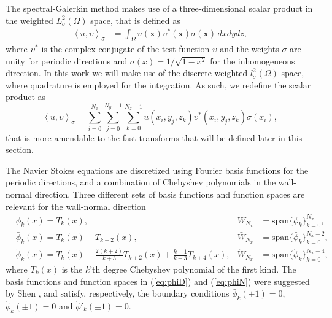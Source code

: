 \documentclass[preprint]{elsarticle}
\newcommand{\N}[1]{\check{#1}}
\newcommand{\D}[1]{\bar{#1}}
\begin{document}
The spectral-Galerkin method makes use of a three-dimensional scalar product in the weighted $L^2_{\sigma}(\Omega)$ space, that is defined as
\begin{align}
\left<u, \upsilon \right>_{\sigma} &= \int_{\Omega} {u(\bm{x}) \upsilon^*(\bm{x})} \sigma(\bm{x})\,dxdydz, 
\end{align}
where $\upsilon^*$ is the complex conjugate of the test function $\upsilon$ and the weights $\sigma$ are unity for 
periodic directions and  $\sigma(x)=1/\sqrt{1-x^2}$ for the inhomogeneous direction. In 
this work we will make use of the discrete weighted $l^2_{\sigma}(\Omega)$ space, 
where quadrature is employed for the integration. As such, we redefine the scalar product as
\begin{equation}
\left<u, \upsilon\right>_{\sigma} = \sum_{i=0}^{N_x}\sum_{j=0}^{N_y-1} \sum_{k=0}^{N_z-1} u(x_i, y_j, z_k) \upsilon^*(x_i, y_j, z_k) \sigma(x_i), \label{eq:quadrature}
\end{equation}
that is more amendable to the fast transforms that will be defined later in this section.

The Navier Stokes equations are discretized using Fourier basis functions for the periodic directions, and a combination of Chebyshev polynomials in the wall-normal direction. Three different sets of basis functions and function spaces are relevant for the wall-normal direction
\begin{align}
&  \phi_k(x) = T_k(x), & W_{N_x} &= \text{span}\{\phi_k\}_{k=0}^{N_x}, \label{eq:Tk}\\
& \D{\phi}_k(x) = T_k(x) - T_{k+2}(x), & \D{W}_{N_x} &= \text{span} \{ \D{\phi}_k\}_{k=0}^{N_x-2}, \label{eq:phiD}\\
& \N{\phi}_k(x) = T_k(x) - \frac{2(k+2)}{k+3} T_{k+2}(x) + 
\frac{k+1}{k+3} T_{k+4}(x), & \N{W}_{N_x} &= \text{span} \{\N{\phi}_k\}_{k=0}^{N_x-4}, \label{eq:phiN} 
\end{align}
where $T_k(x)$ is the $k$'th degree Chebyshev polynomial of the first kind. The 
basis functions and function spaces in (\ref{eq:phiD}) and (\ref{eq:phiN}) were 
suggested by Shen \cite{Shen95}, and satisfy, respectively, the boundary conditions 
$\D{\phi}_k(\pm 1) = 0$, $\N{\phi}_k(\pm 1)=0$ and $\N{\phi}'_k(\pm 1)=0$. 
\end{document}
